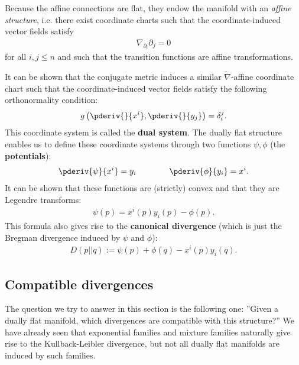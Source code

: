 
    Because the affine connections are flat, they endow the manifold with an \textit{affine structure}, i.e. there exist coordinate charts such that the coordinate-induced vector fields satisfy
    \begin{gather}
        \nabla_{\partial_i}\partial_j = 0
    \end{gather}
    for all $i,j\leq n$ and such that the transition functions are affine transformations.

    It can be shown that the conjugate metric induces a similar $\widetilde{\nabla}$-affine coordinate chart such that the coordinate-induced vector fields satisfy the following orthonormality condition:
    \begin{gather}
        g\left(\pderiv{}{x^i}, \pderiv{}{y_j}\right) = \delta^j_i.
    \end{gather}
    This coordinate system is called the \textbf{dual system}. The dually flat structure enables us to define these coordinate systems through two functions $\psi,\phi$ (the \textbf{potentials}):
    \begin{gather}
        \pderiv{\psi}{x^i} = y_i\qquad\qquad \pderiv{\phi}{y_i}=x^i.
    \end{gather}
    It can be shown that these functions are (strictly) convex and that they are Legendre transforms:
    \begin{gather}
        \psi(p) = x^i(p)y_i(p)-\phi(p).
    \end{gather}
    This formula also gives rise to the \textbf{canonical divergence} (which is just the Bregman divergence induced by $\psi$ and $\phi$):
    \begin{gather}
        D(p||q) := \psi(p) + \phi(q) - x^i(p)y_i(q).
    \end{gather}

\subsection{Compatible divergences}

    The question we try to answer in this section is the following one: ''Given a dually flat manifold, which divergences are compatible with this structure?'' We have already seen that exponential families and mixture families naturally give rise to the Kullback-Leibler divergence, but not all dually flat manifolds are induced by such families.

